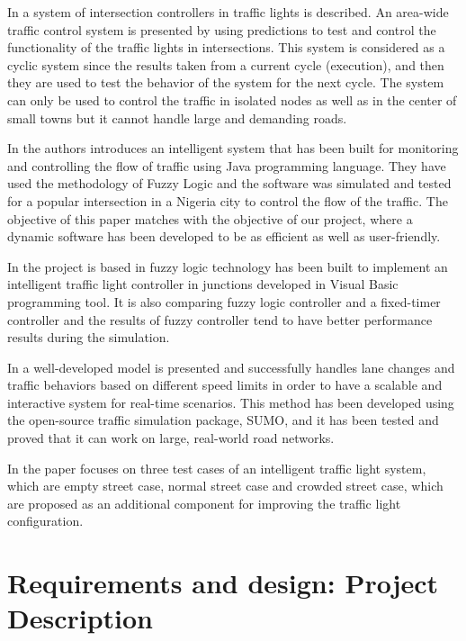 \documentclass[oneside]{article}
\begin{document}
\noindent In \cite{tavladakis1999development} a system of intersection controllers in traffic lights is described. An area-wide traffic control system is presented by using predictions to test and control the functionality of the traffic lights in intersections. This system is considered as a cyclic system since the results taken from a current cycle (execution), and then they are used to test the behavior of the system for the next cycle. The system can only be used to control the traffic in isolated nodes as well as in the center of small towns but it cannot handle large and demanding roads.
\newline

\noindent In \cite{chinyere2011design} the authors introduces an intelligent system that has been built for monitoring and controlling the flow of traffic using Java programming language. They have used the methodology of Fuzzy Logic and the software was simulated and tested for a popular intersection in a Nigeria city to control the flow of the traffic. 
The objective of this paper matches with the objective of our project, where a dynamic software has been developed to be as efficient as well as user-friendly. 
\newline

\noindent In \cite{center1996intelligent} the project is based in fuzzy logic technology has been built to implement an intelligent traffic light controller in junctions developed in Visual Basic programming tool. It is also comparing fuzzy logic controller and a fixed-timer controller and the results of fuzzy controller tend to have better performance results during the simulation.
\newline

\noindent In \cite{sewall2010continuum} a well-developed model is presented and successfully handles lane changes and traffic behaviors based on different speed limits in order to have a scalable and interactive system for real-time scenarios. This method has been developed using the open-source traffic simulation package, SUMO, and it has been tested and proved that it can work on large, real-world road networks. 

\noindent In \cite{kareem2011intelligent} the paper focuses on three test cases of an intelligent traffic light system, which are empty street case, normal street case and crowded street case, which are proposed as an additional component for improving the traffic light configuration. 
\newpage

\section{Requirements and design: Project Description}
\end{document}
